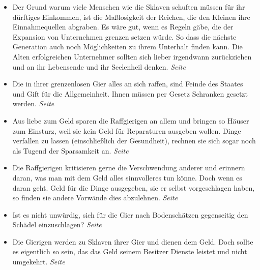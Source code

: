 \begin{itemize}
\begin{itemize}
 \item Der Grund warum viele Menschen wie die Sklaven schuften müssen für ihr
dürftiges Einkommen, ist die Maßlosigkeit der Reichen, die den Kleinen ihre
Einnahmequellen abgraben. Es wäre gut, wenn es Regeln gäbe, die der Expansion
von Unternehmen grenzen setzen würde. So dass die nächste Generation
auch noch Möglichkeiten zu ihrem Unterhalt finden kann. Die Alten
erfolgreichen Unternehmer sollten sich lieber irgendwann zurückziehen und an
ihr Lebensende und ihr Seelenheil denken.
 \dotfill \textit{Seite~\pageref{ref:13_08_reichtum_sklaverei}}\\

 \item Die in ihrer grenzenlosen Gier alles an sich raffen, sind Feinde des
Staates und Gift für die Allgemeinheit. Ihnen müssen per Gesetz Schranken gesetzt
werden.
 \dotfill \textit{Seite~\pageref{ref:13_14_reichtum_schaden}}\\

 \item Aus liebe zum Geld sparen die Raffgierigen an allem und bringen so
Häuser zum Einsturz, weil sie kein Geld für Reparaturen ausgeben wollen. Dinge
verfallen zu lassen (einschließlich der Gesundheit), rechnen sie sich sogar
noch als Tugend der Sparsamkeit an.
 \dotfill \textit{Seite~\pageref{ref:13_14_reichtum_einsturz}}\\

 \item Die Raffgierigen kritisieren gerne die Verschwendung anderer und
 erinnern daran, was man mit dem Geld alles sinnvolleres tun könne. Doch
 wenn es daran geht. Geld für die Dinge ausgegeben, sie er selbst vorgeschlagen
 haben, so finden sie andere Vorwände dies abzulehnen.
 \dotfill \textit{Seite~\pageref{ref:13_15_Kapitalisten_kritik}}\\

 \item Ist es nicht unwürdig, sich für die Gier nach Bodenschätzen
gegenseitig den Schädel einzuschlagen?
 \dotfill \textit{Seite~\pageref{ref:13_21_Kapitalisten_kritik}}\\

 \item Die Gierigen werden zu Sklaven ihrer Gier und dienen dem Geld. Doch
 sollte es eigentlich so sein, das das Geld seinem Besitzer Dienste leistet und nicht umgekehrt.
 \dotfill \textit{Seite~\pageref{ref:13_21_Kapitalisten_dienerschaft}}\\


\end{itemize}
\end{itemize}
